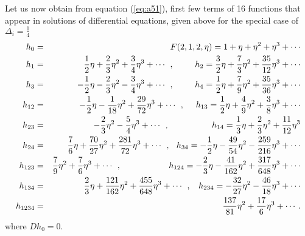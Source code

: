 \documentclass[a4paper,11pt]{article}
\begin{document}
Let us now obtain from equation (\ref{eq:a51}), first few terms of
16 functions that appear in solutions of differential equations,
given above for the special case of $\Delta_{i}=\frac{1}{4}$
\begin{eqnarray}\label{eq:a84}
h_{0}&=& F(2,1,2,\eta)=1+\eta+\eta^{2}+\eta^{3}+\cdots\nonumber\\
h_{1}&=&\:\:\:\frac{1}{2}\eta+\frac{2}{3}\eta^{2}+\frac{3}{4}\eta^{3}+\cdots\:\:,\:\:\:\:\:\:\hspace{4mm}h_{2}=\frac{3}{2}\eta+\frac{7}{3}\eta^{2}+\frac{35}{12}\eta^{3}+\cdots\nonumber\\
h_{3}&=&-\frac{1}{2}\eta-\frac{2}{3}\eta^{2}-\frac{3}{4}\eta^{3}+\cdots\:\:,\:\:\:\:\:\:\hspace{4mm}h_{4}=\frac{1}{2}\eta+\frac{7}{9}\eta^{2}+\frac{35}{36}\eta^{3}+\cdots\nonumber\\
h_{12}&=&-\frac{1}{2}\eta-\frac{1}{18}\eta^{2}+\frac{29}{72}\eta^{3}+\cdots\:\:,\:\:\:\:\:\:h_{13}=\frac{1}{2}\eta+\frac{4}{9}\eta^{2}+\frac{3}{8}\eta^{3}+\cdots\nonumber\\
h_{23}&=&-\frac{2}{3}\eta^{2}-\frac{5}{4}\eta^{3}+\cdots\:\:,\:\:\:\:\:\:\hspace{13mm}
h_{14}=\frac{1}{3}\eta+\frac{2}{3}\eta^{2}+\frac{11}{12}\eta^{3}\nonumber\\
h_{24}&=&\frac{7}{6}\eta+\frac{70}{27}\eta^{2}+\frac{281}{72}\eta^{3}+\cdots\:\:,\:\:\hspace{1mm}h_{34}=-\frac{1}{2}\eta-\frac{49}{54}\eta^{2}-\frac{259}{216}\eta^{3}+\cdots\nonumber\\
h_{123}&=&\frac{7}{9}\eta^{2}+\frac{7}{6}\eta^{3}+\cdots\:\:,\:\:\:\:\:\:\hspace{15mm}h_{124}=-\frac{2}{3}\eta-\frac{41}{162}\eta^{2}+\frac{317}{648}\eta^{3}+\cdots\nonumber\\
h_{134}&=&\frac{2}{3}\eta+\frac{121}{162}\eta^{2}+\frac{455}{648}\eta^{3}+\cdots\:\:,\:\:\:\:h_{234}=-\frac{32}{27}\eta^{2}-\frac{46}{18}\eta^{3}+\cdots\nonumber\\
h_{1234}&=&\frac{137}{81}\eta^{2}+\frac{17}{6}\eta^{3}+\cdots.
\end{eqnarray}
where $Dh_{0}=0$.
\end{document}
